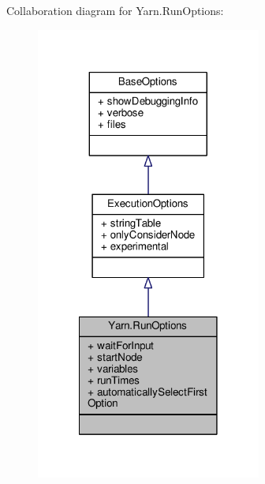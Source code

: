 Collaboration diagram for Yarn.\-Run\-Options\-:
\nopagebreak
\begin{figure}[H]
\begin{center}
\leavevmode
\includegraphics[width=210pt]{a00745}
\end{center}
\end{figure}
